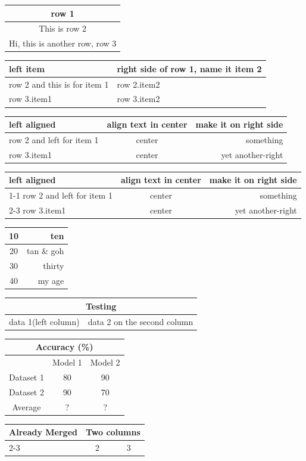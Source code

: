 \documentclass{article}
\begin{document}
\begin{tabular}{|c|}
\hline
row 1 \\
\hline
This is row 2 \\
\hline
Hi, this is another row, row 3 \\
\hline
\end{tabular}

\begin{tabular}{|l|l|}
\hline
left item & right side of row 1, name it item 2\\
\hline
row 2 and this is for item 1 & row 2.item2\\
\hline
row 3.item1 & row 3.item2\\
\hline
\end{tabular}

\begin{tabular}{l c r}
\hline
left aligned & align text in center & make it on right side\\
\hline
row 2 and left for item 1 & center & something\\
\hline
row 3.item1 & center & yet another-right\\
\hline
\end{tabular}

\begin{tabular}{|l|c|r|}
\hline
left aligned & align text in center & make it on right side\\
\cline{1-1}
row 2 and left for item 1 & center & something\\
\cline{2-3}
row 3.item1 & center & yet another-right\\ 
\hline
\end{tabular}

\begin{tabular}{|c|r|}
\hline
10 & ten\\
\hline
20 & tan \& goh\\
\hline
30 & thirty\\
\hline
\hline
40 & my age\\
\hline
\end{tabular}

\begin{tabular}{|c|c|}
\hline
\multicolumn{2}{|c|}{Testing}\\
\hline
data 1(left column) & data 2 on the second column\\
\hline
\end{tabular}

\begin{tabular}{c c c}
\hline
\hline
\multicolumn{3}{c}{Accuracy (\%)}\\
\hline
& Model 1 & Model 2\\
Dataset 1 & 80 & 90\\
Dataset 2 & 90 & 70\\
\hline
Average & ? & ?\\
\hline
\hline
\end{tabular}

\begin{tabular}{|l|c|c|}
\hline
\multirow{2}{*}{Already Merged} &
\multicolumn{2}{|l|}{Two columns} \\
\cline{2-3}
& 2 & 3 \\
\hline
\end{tabular}
\end{document}
